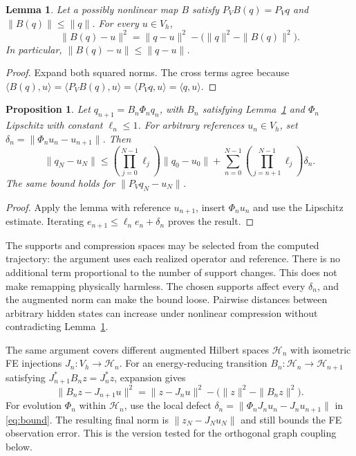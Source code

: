 \documentclass[10pt,a4paper]{article}
\newtheorem{proposition}{Proposition}
\newtheorem{lemma}{Lemma}
\newcommand{\V}{V_h}
\newcommand{\PV}{P_V}
\begin{document}
\begin{lemma}\label{lem:relative}
Let a possibly nonlinear map $B$ satisfy
$\PV B(q)=\PV q$ and $\|B(q)\|\leq\|q\|$. For every $u\in\V$,
\begin{equation}\label{eq:relative}
 \|B(q)-u\|^2=\|q-u\|^2-
 \bigl(\|q\|^2-\|B(q)\|^2\bigr).
\end{equation}
In particular, $\|B(q)-u\|\leq\|q-u\|$.
\end{lemma}
\begin{proof}
Expand both squared norms. The cross terms agree because
$\langle B(q),u\rangle=\langle\PV B(q),u\rangle
=\langle\PV q,u\rangle=\langle q,u\rangle$.
\end{proof}

\begin{proposition}\label{prop:error}
Let $q_{n+1}=B_n\Phi_nq_n$, with $B_n$ satisfying
Lemma~\ref{lem:relative} and $\Phi_n$ Lipschitz with constant
$\ell_n\leq1$. For arbitrary references $u_n\in\V$, set
$\delta_n=\|\Phi_nu_n-u_{n+1}\|$. Then
\begin{equation}\label{eq:bound}
 \|q_N-u_N\|\leq
 \left(\prod_{j=0}^{N-1}\ell_j\right)\|q_0-u_0\|
 +\sum_{n=0}^{N-1}
 \left(\prod_{j=n+1}^{N-1}\ell_j\right)\delta_n.
\end{equation}
The same bound holds for $\|\PV q_N-u_N\|$.
\end{proposition}
\begin{proof}
Apply the lemma with reference $u_{n+1}$, insert $\Phi_nu_n$ and
use the Lipschitz estimate. Iterating
$e_{n+1}\leq\ell_ne_n+\delta_n$ proves the result.
\end{proof}

The supports and compression spaces may be selected from the computed
trajectory: the argument uses each realized operator and reference.
There is no additional term proportional to the number of support
changes. This does not make remapping physically harmless. The chosen
supports affect every $\delta_n$, and the augmented norm can make the
bound loose. Pairwise distances between arbitrary hidden states can
increase under nonlinear compression without contradicting
Lemma~\ref{lem:relative}.

The same argument covers different augmented Hilbert spaces
$\mathcal H_n$ with isometric FE injections $J_n:\V\to\mathcal H_n$.
For an energy-reducing transition $B_n:\mathcal H_n\to\mathcal H_{n+1}$
satisfying $J_{n+1}^*B_nz=J_n^*z$, expansion gives
\[
 \|B_nz-J_{n+1}u\|^2
 =\|z-J_nu\|^2-\bigl(\|z\|^2-\|B_nz\|^2\bigr).
\]
For evolution $\Phi_n$ within $\mathcal H_n$, use the local defect
$\delta_n=\|\Phi_nJ_nu_n-J_nu_{n+1}\|$ in
\eqref{eq:bound}. The resulting final norm is
$\|z_N-J_Nu_N\|$ and still bounds the FE observation error.
This is the version tested for the orthogonal graph coupling below.
\end{document}
